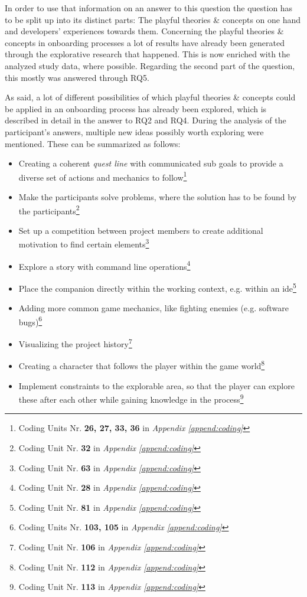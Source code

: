 In order to use that information on an answer to this question the question has to be split up into its distinct parts: The playful theories \& concepts on one hand and developers' experiences towards them. Concerning the playful theories \& concepts in onboarding processes a lot of results have already been generated through the explorative research that happened. This is now enriched with the analyzed study data, where possible. Regarding the second part of the question, this mostly was answered through RQ5.

As said, a lot of different possibilities of which playful theories \& concepts could be applied in an onboarding process has already been explored, which is described in detail in the answer to RQ2 and RQ4. During the analysis of the participant's answers, multiple new ideas possibly worth exploring were mentioned. These can be summarized as follows:

\begin{itemize}
  \item{Creating a coherent \textit{quest line} with communicated sub goals to provide a diverse set of actions and mechanics to follow\footnote{Coding Units Nr. \textbf{26, 27, 33, 36} in \textit{Appendix \ref{append:coding}}}}
  \item{Make the participants solve problems, where the solution has to be found by the participants\footnote{Coding Unit Nr. \textbf{32} in \textit{Appendix \ref{append:coding}}}}
  \item{Set up a competition between project members to create additional motivation to find certain elements\footnote{Coding Unit Nr. \textbf{63} in \textit{Appendix \ref{append:coding}}}}
  \item{Explore a story with command line operations\footnote{Coding Unit Nr. \textbf{28} in \textit{Appendix \ref{append:coding}}}}
  \item{Place the companion directly within the working context, e.g. within an \gls{ide}\footnote{Coding Unit Nr. \textbf{81} in \textit{Appendix \ref{append:coding}}}}
  \item{Adding more common game mechanics, like fighting enemies (e.g. software bugs)\footnote{Coding Units Nr. \textbf{103, 105} in \textit{Appendix \ref{append:coding}}}}
  \item{Visualizing the project history\footnote{Coding Unit Nr. \textbf{106} in \textit{Appendix \ref{append:coding}}}}
  \item{Creating a character that follows the player within the game world\footnote{Coding Unit Nr. \textbf{112} in \textit{Appendix \ref{append:coding}}}}
  \item{Implement constraints to the explorable area, so that the player can explore these after each other while gaining knowledge in the process\footnote{Coding Unit Nr. \textbf{113} in \textit{Appendix \ref{append:coding}}}}
\end{itemize}

